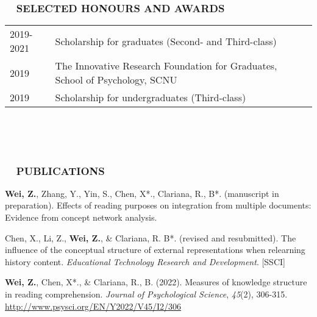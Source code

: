 \documentclass[a4paper, 12pt]{article}
\begin{document}
\  \par 
\  \par 



\subsubsection*{ \ \ SELECTED HONOURS AND AWARDS}

\begin{tabularx}{\textwidth}{p{2cm} X}

    2019-2021 & Scholarship for graduates (Second- and Third-class)\\

    2019 & The Innovative Research Foundation for Graduates, School of Psychology, SCNU \\
    
    2019 & Scholarship for undergraduates (Third-class)
    
\end{tabularx}

\  \par
\  \par


\subsubsection*{ \ \ PUBLICATIONS}

\begin{description}
    
    \item \textbf{Wei, Z.}, Zhang, Y., Yin, S., Chen, X*., Clariana, R., B*. (manuscript in preparation). Effects of reading purposes on integration from multiple documents: Evidence from concept network analysis.

    \item Chen, X., Li, Z., \textbf{Wei, Z.}, \& Clariana, R. B*. (revised and resubmitted). The influence of the conceptual structure of external representations when relearning history content.  \textit{Educational Technology Research and Development}. [SSCI]

    \item \textbf{Wei, Z.}, Chen, X*., \& Clariana, R., B. (2022). Measures of knowledge structure in reading comprehension. \textit{Journal of Psychological Science}, \textit{45}(2), 306-315. \href{http://www.psysci.org/EN/Y2022/V45/I2/306}{http://www.psysci.org/EN/Y2022/V45/I2/306}

    
    \end{description}
\end{document}
